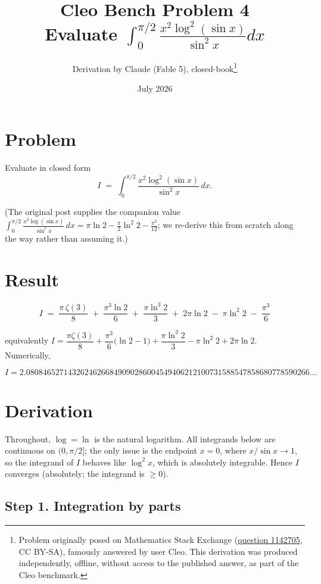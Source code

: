 \documentclass[11pt]{article}
\title{Cleo Bench Problem 4\\[1ex]\large Evaluate $\int_0^{\pi/2}\frac{x^2\log^2{(\sin{x})}}{\sin^2x}dx$}
\author{Derivation by Claude (Fable 5), closed-book\thanks{Problem originally
posed on Mathematics Stack Exchange
(\href{https://math.stackexchange.com/q/1142705}{question 1142705}, CC BY-SA),
famously answered by user Cleo. This derivation was produced independently,
offline, without access to the published answer, as part of the Cleo benchmark.}}
\date{July 2026}
\theoremstyle{remark}
\begin{document}
\maketitle

\section*{Problem}

Evaluate in closed form
$$I \;=\; \int_0^{\pi/2}\frac{x^2\log^2(\sin x)}{\sin^2 x}\,dx .$$

(The original post supplies the companion value
$\displaystyle\int_0^{\pi/2}\frac{x^2\log(\sin x)}{\sin^2x}\,dx=\pi\ln 2-\frac{\pi}{2}\ln^2 2-\frac{\pi^3}{12}$;
we re-derive this from scratch along the way rather than assuming it.)

\section*{Result}

$$\boxed{\;I \;=\; \frac{\pi\,\zeta(3)}{8}\;+\;\frac{\pi^{3}\ln 2}{6}\;+\;\frac{\pi\ln^{3}2}{3}\;+\;2\pi\ln 2\;-\;\pi\ln^{2}2\;-\;\frac{\pi^{3}}{6}\;}$$

equivalently $I=\dfrac{\pi\zeta(3)}{8}+\dfrac{\pi^{3}}{6}\bigl(\ln 2-1\bigr)+\dfrac{\pi\ln^{3}2}{3}-\pi\ln^{2}2+2\pi\ln 2$. Numerically,

$$I = 2.08084652714326246266849090286004549406212100731588547858680778590266\ldots$$

\section*{Derivation}

Throughout, $\log=\ln$ is the natural logarithm. All integrands below are continuous on $(0,\pi/2]$; the only issue is the endpoint $x=0$, where $x/\sin x\to 1$, so the integrand of $I$ behaves like $\log^2 x$, which is absolutely integrable. Hence $I$ converges (absolutely; the integrand is $\ge 0$).

\subsection*{Step 1. Integration by parts}
\end{document}
